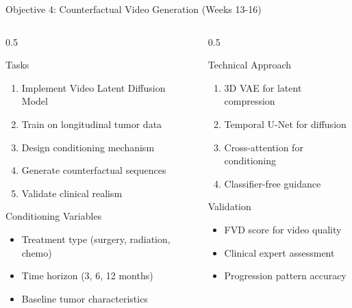 \documentclass[aspectratio=169]{beamer}
\begin{document}
\begin{frame}{Objective 4: Counterfactual Video Generation (Weeks 13-16)}
    \begin{columns}
        \begin{column}{0.5\textwidth}
            \begin{block}{Tasks}
                \begin{enumerate}
                    \item Implement Video Latent Diffusion Model
                    \item Train on longitudinal tumor data
                    \item Design conditioning mechanism
                    \item Generate counterfactual sequences
                    \item Validate clinical realism
                \end{enumerate}
            \end{block}
            
            \begin{block}{Conditioning Variables}
                \begin{itemize}
                    \item Treatment type (surgery, radiation, chemo)
                    \item Time horizon (3, 6, 12 months)
                    \item Baseline tumor characteristics
                \end{itemize}
            \end{block}
        \end{column}
        \begin{column}{0.5\textwidth}
            \begin{block}{Technical Approach}
                \begin{enumerate}
                    \item 3D VAE for latent compression
                    \item Temporal U-Net for diffusion
                    \item Cross-attention for conditioning
                    \item Classifier-free guidance
                \end{enumerate}
            \end{block}
            
            \begin{alertblock}{Validation}
                \begin{itemize}
                    \item FVD score for video quality
                    \item Clinical expert assessment
                    \item Progression pattern accuracy
                \end{itemize}
            \end{alertblock}
        \end{column}
    \end{columns}
\end{frame}
\end{document}
